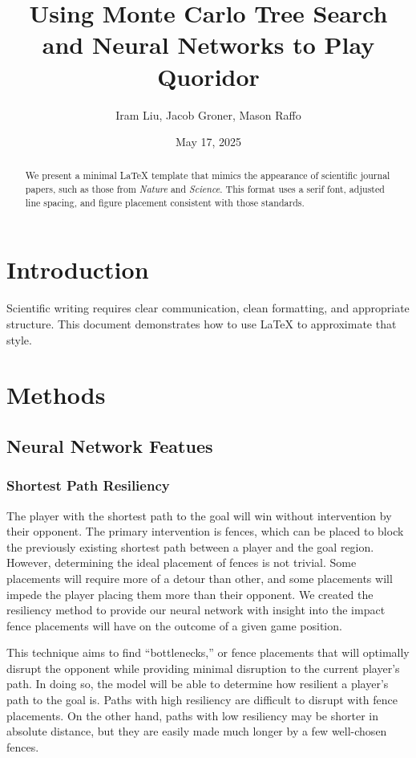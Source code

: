 \documentclass[10pt]{article}
\title{\bfseries Using Monte Carlo Tree Search and Neural Networks to Play Quoridor}
\author{
    Iram Liu, Jacob Groner, Mason Raffo
}
\date{May 17, 2025}
\begin{document}
\maketitle

\begin{abstract}
We present a minimal LaTeX template that mimics the appearance of scientific journal papers, such as those from \emph{Nature} and \emph{Science}. This format uses a serif font, adjusted line spacing, and figure placement consistent with those standards.
\end{abstract}

\section{Introduction}
Scientific writing requires clear communication, clean formatting, and appropriate structure. This document demonstrates how to use LaTeX to approximate that style.

\section{Methods}

\subsection{Neural Network Featues}

\subsubsection{Shortest Path Resiliency}

The player with the shortest path to the goal will win without intervention by their opponent. The primary intervention is fences, which can be placed to block the previously existing shortest path between a player and the goal region. However, determining the ideal placement of fences is not trivial. Some placements will require more of a detour than other, and some placements will impede the player placing them more than their opponent. We created the resiliency method to provide our neural network with insight into the  impact fence placements will have on the outcome of a given game position.

This technique aims to find ``bottlenecks,'' or fence placements that will optimally disrupt the opponent while providing minimal disruption to the current player's path. In doing so, the model will be able to determine how resilient a player's path to the goal is. Paths with high resiliency are difficult to disrupt with fence placements. On the other hand, paths with low resiliency may be shorter in absolute distance, but they are easily made much longer by a few well-chosen fences.
\end{document}
